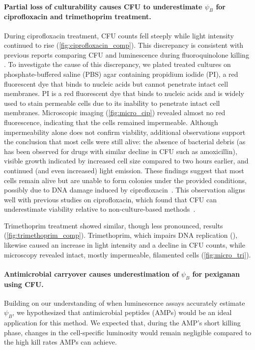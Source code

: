 \paragraph{Partial loss of culturability causes CFU to underestimate \(\psi_B\) for ciprofloxacin and trimethoprim treatment.}
During ciprofloxacin treatment, CFU counts fell steeply while light intensity continued to rise (\autoref{fig:ciprofloxacin_comp}).
This discrepancy is consistent with previous reports comparing CFU and luminescence during fluoroquinolone killing \cite{Salisbury1999, Marques2005}.
To investigate the cause of this discrepancy, we plated treated cultures on phosphate-buffered saline (PBS) agar containing propidium iodide (PI), a red fluorescent dye that binds to nucleic acids but cannot penetrate intact cell membranes.
PI is a red fluorescent dye that binds to nucleic acids and is widely used to stain permeable cells due to its inability to penetrate intact cell membranes.
Microscopic imaging (\autoref{fig:micro_cip}) revealed almost no red fluorescence, indicating that the cells remained impermeable.
Although impermeability alone does not confirm viability, additional observations support the conclusion that most cells were still alive: the absence of bacterial debris (as has been observed for drugs with similar decline in CFU such as amoxicillin), visible growth indicated by increased cell size compared to two hours earlier, and continued (and even increased) light emission.
These findings suggest that most cells remain alive but are unable to form colonies under the provided conditions, possibly due to DNA damage induced by ciprofloxacin~\cite{Levine1998}.
This observation aligns well with previous studies on ciprofloxacin, which found that CFU can underestimate viability relative to non-culture-based methods~\cite{Besnard2002, Wu2024, Fanous2025}.

Trimethoprim treatment showed similar, though less pronounced, results (\autoref{fig:trimethoprim_comp}).
Trimethoprim, which impairs DNA replication (\cite{Gleckman1981}), likewise caused an increase in light intensity and a decline in CFU counts, while microscopy revealed intact, mostly impermeable, filamented cells (\autoref{fig:micro_tri}).

\paragraph{Antimicrobial carryover causes underestimation of $\psi_B$ for pexiganan using CFU.}
Building on our understanding of when luminescence assays accurately estimate $\psi_B$, we hypothesized that antimicrobial peptides (AMPs) would be an ideal application for this method.
We expected that, during the AMP’s short killing phase, changes in the cell‐specific luminosity would remain negligible compared to the high kill rates AMPs can achieve.

